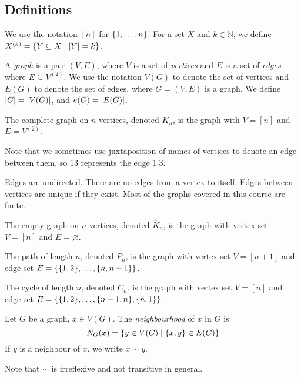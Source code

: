\subsection{Definitions}
We use the notation \( [n] \) for \( \qty{1, \dots,n} \).
For a set \( X \) and \( k \in \mathbb N \), we define \( X^{(k)} = \qty{Y \subseteq X \mid \abs{Y} = k} \).
\begin{definition}
	A \emph{graph} is a pair \( (V, E) \), where \( V \) is a set of \emph{vertices} and \( E \) is a set of \emph{edges} where \( E \subseteq V^{(2)} \).
	We use the notation \( V(G) \) to denote the set of vertices and \( E(G) \) to denote the set of edges, where \( G = (V, E) \) is a graph.
	We define \( \abs{G} = \abs{V(G)} \), and \( e(G) = \abs{E(G)} \).
\end{definition}
\begin{example}
	The complete graph on \( n \) vertices, denoted \( K_n \), is the graph with \( V = [n] \) and \( E = V^{(2)} \).
\end{example}
Note that we sometimes use juxtaposition of names of vertices to denote an edge between them, so \( 13 \) represents the edge \( \qty{1, 3} \).
\begin{remark}
	Edges are undirected. There are no edges from a vertex to itself. Edges between vertices are unique if they exist.
	Most of the graphs covered in this course are finite.
\end{remark}
\begin{example}
	The empty graph on \( n \) vertices, denoted \( \overline K_n \), is the graph with vertex set \( V = [n] \) and \( E = \varnothing \).
\end{example}
\begin{example}
	The path of length \( n \), denoted \( P_n \), is the graph with vertex set \( V = [n+1] \) and edge set \( E = \qty{\qty{1,2},\dots,\qty{n,n+1}} \).
\end{example}
\begin{example}
	The cycle of length \( n \), denoted \( C_n \), is the graph with vertex set \( V = [n] \) and edge set \( E = \qty{\qty{1,2}, \dots, \qty{n-1,n}, \qty{n,1}} \).
\end{example}
\begin{definition}
	Let \( G \) be a graph, \( x \in V(G) \).
	The \emph{neighbourhood} of \( x \) in \( G \) is
	\[ N_G(x) = \qty{y \in V(G) \mid \qty{x,y} \in E(G)} \]
	If \( y \) is a neighbour of \( x \), we write \( x \sim y \).
\end{definition}
Note that \( \sim \) is irreflexive and not transitive in general.
